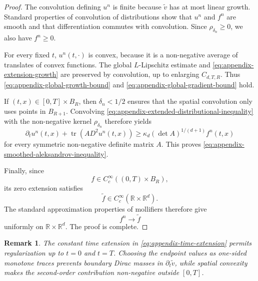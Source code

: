 \documentclass[12pt,oneside, reqno]{amsart}
\newtheorem{remark}[theorem]{Remark}
\numberwithin{equation}{section}
\begin{document}
\begin{proof}
		The convolution defining $u^n$ is finite because
		$\widetilde v$ has at most linear growth. Standard properties of
		convolution of distributions
		\cite[Chapter~4]{Hormander-2003} show that $u^n$ and $f^n$ are
		smooth and that differentiation commutes with convolution. Since
		$\rho_{\delta_n}\geq0$, we also have $f^n\geq0$.
		
		For every fixed $t$, $u^n(t,\cdot)$ is convex, because it is a
		non-negative average of translates of convex functions. The global
		$L$-Lipschitz estimate and
		\eqref{eq:appendix-extension-growth} are preserved by convolution, up
		to enlarging $C_{d,T,R}$. Thus
		\eqref{eq:appendix-global-growth-bound} and
		\eqref{eq:appendix-global-gradient-bound} hold.
		
		If $(t,x)\in[0,T]\times B_R$, then
		$\delta_n<1/2$ ensures that the spatial convolution only uses points
		in $B_{R+1}$. Convolving
		\eqref{eq:appendix-extended-distributional-inequality} with the
		non-negative kernel $\rho_{\delta_n}$ therefore yields
		\[
		\partial_tu^n(t,x)
		+
		\operatorname{tr}\!\left(A D^2u^n(t,x)\right)
		\geq
		\kappa_d(\det A)^{1/(d+1)}f^n(t,x)
		\]
		for every symmetric non-negative definite matrix $A$. This proves
		\eqref{eq:appendix-smoothed-aleksandrov-inequality}.
		
		Finally, since
		\[
		f\in C_c^\infty((0,T)\times B_R),
		\]
		its zero extension satisfies
		\[
		\widetilde f\in
		C_c^\infty(\mathbb R\times\mathbb R^d).
		\]
		The standard approximation properties of mollifiers therefore give
		\[
		f^n\longrightarrow\widetilde f
		\]
		uniformly on $\mathbb R\times\mathbb R^d$. The proof is complete.
	\end{proof}
	
	\begin{remark}
		\label{rem:constant-time-extension}
		The constant time extension in
		\eqref{eq:appendix-time-extension} permits regularization up to
		$t=0$ and $t=T$. Choosing the endpoint values as one-sided monotone
		traces prevents boundary Dirac masses in
		$\partial_t\widetilde v$, while spatial convexity makes the
		second-order contribution non-negative outside $[0,T]$.
	\end{remark}
	
	
	
	
	
	
	
	
	
	
	
\end{document}
